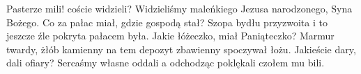 \beginverse
Pasterze mili! coście widzieli?
Widzieliśmy maleńkiego
Jezusa narodzonego,
Syna Bożego.
\endverse
\beginverse
Co za pałac miał, gdzie gospodą stał?
Szopa bydłu przyzwoita
i to jeszcze źle pokryta
pałacem była.
\endverse
\beginverse
Jakie łóżeczko, miał Paniąteczko?
Marmur twardy, żłób kamienny
na tem depozyt zbawienny
spoczywał łożu.
\endverse
\beginverse
Jakieście dary, dali ofiary?
Sercaśmy własne oddali
a odchodząc poklękali
czołem mu bili.
\endverse
\endsong